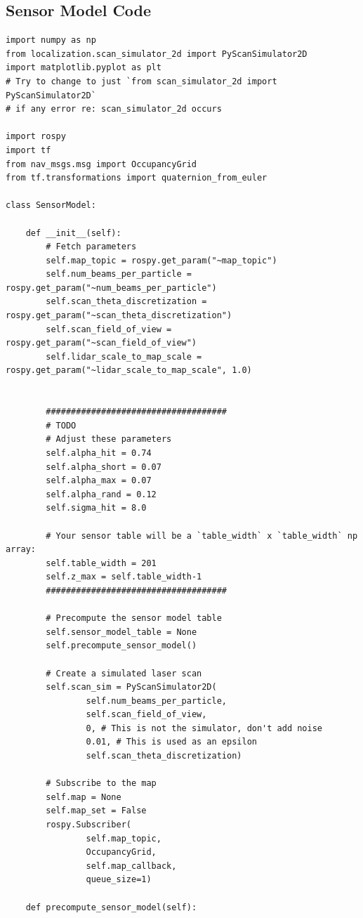 \documentclass{article}
\begin{document}
\subsection{Sensor Model Code}
{\footnotesize
\begin{verbatim}
import numpy as np
from localization.scan_simulator_2d import PyScanSimulator2D
import matplotlib.pyplot as plt
# Try to change to just `from scan_simulator_2d import PyScanSimulator2D` 
# if any error re: scan_simulator_2d occurs

import rospy
import tf
from nav_msgs.msg import OccupancyGrid
from tf.transformations import quaternion_from_euler

class SensorModel:

    def __init__(self):
        # Fetch parameters
        self.map_topic = rospy.get_param("~map_topic")
        self.num_beams_per_particle = rospy.get_param("~num_beams_per_particle")
        self.scan_theta_discretization = rospy.get_param("~scan_theta_discretization")
        self.scan_field_of_view = rospy.get_param("~scan_field_of_view")
        self.lidar_scale_to_map_scale = rospy.get_param("~lidar_scale_to_map_scale", 1.0)


        ####################################
        # TODO
        # Adjust these parameters
        self.alpha_hit = 0.74
        self.alpha_short = 0.07
        self.alpha_max = 0.07
        self.alpha_rand = 0.12
        self.sigma_hit = 8.0

        # Your sensor table will be a `table_width` x `table_width` np array:
        self.table_width = 201
        self.z_max = self.table_width-1
        ####################################

        # Precompute the sensor model table
        self.sensor_model_table = None
        self.precompute_sensor_model()

        # Create a simulated laser scan
        self.scan_sim = PyScanSimulator2D(
                self.num_beams_per_particle,
                self.scan_field_of_view,
                0, # This is not the simulator, don't add noise
                0.01, # This is used as an epsilon
                self.scan_theta_discretization) 

        # Subscribe to the map
        self.map = None
        self.map_set = False
        rospy.Subscriber(
                self.map_topic,
                OccupancyGrid,
                self.map_callback,
                queue_size=1)

    def precompute_sensor_model(self):


\end{verbatim}}
\end{document}
